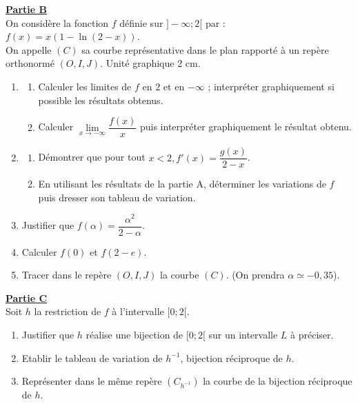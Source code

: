 \documentclass[12pt,a4paper]{article}
\begin{document}
\vspace{0.5cm}

\noindent \underline{\textbf{Partie B}} \\
On considère la fonction $f$ définie sur $]-\infty; 2[$ par : $f(x) = x(1 - \ln(2 - x))$. \\
On appelle $(C)$ sa courbe représentative dans le plan rapporté à un repère orthonormé $(O, I, J)$. Unité graphique 2 cm.
\begin{enumerate}
    \item 
    \begin{enumerate}
        \item Calculer les limites de $f$ en $2$ et en $-\infty$ ; interpréter graphiquement si possible les résultats obtenus.
        \item Calculer $\lim\limits_{x \to -\infty} \dfrac{f(x)}{x}$ puis interpréter graphiquement le résultat obtenu.
    \end{enumerate}
    \item 
    \begin{enumerate}
        \item Démontrer que pour tout $x < 2, f'(x) = \dfrac{g(x)}{2 - x}$.
        \item En utilisant les résultats de la partie A, déterminer les variations de $f$ puis dresser son tableau de variation.
    \end{enumerate}
    \item Justifier que $f(\alpha) = \dfrac{\alpha^2}{2 - \alpha}$.
    \item Calculer $f(0)$ et $f(2 - e)$.
    \item Tracer dans le repère $(O, I, J)$ la courbe $(C)$. (On prendra $\alpha \simeq -0,35$).
\end{enumerate}

\vspace{0.5cm}

\noindent \underline{\textbf{Partie C}} \\
Soit $h$ la restriction de $f$ à l'intervalle $[0; 2[$.
\begin{enumerate}
    \item Justifier que $h$ réalise une bijection de $[0; 2[$ sur un intervalle $L$ à préciser.
    \item Etablir le tableau de variation de $h^{-1}$, bijection réciproque de $h$.
    \item Représenter dans le même repère $(C_{h^{-1}})$ la courbe de la bijection réciproque de $h$.
\end{enumerate}
\end{document}
